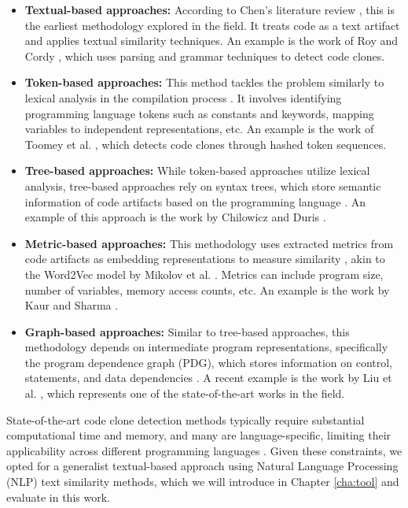 \begin{itemize}
    \item \textbf{Textual-based approaches:} According to Chen’s literature 
    review \citep{litreview}, this is the earliest methodology explored in 
    the field. It treats code as a text artifact and applies textual similarity
    techniques. An example is the work of Roy and Cordy \citep{textexample}, 
    which uses parsing and grammar techniques to detect code clones.

    \item \textbf{Token-based approaches:} This method tackles the problem 
    similarly to lexical analysis in the compilation process \citep{litreview}. 
    It involves identifying programming language tokens such as constants and 
    keywords, mapping variables to independent representations, etc. An example
    is the work of Toomey et al. \citep{tokenexample}, which detects code 
    clones through hashed token sequences.

    \item \textbf{Tree-based approaches:} While token-based approaches utilize
     lexical analysis, tree-based approaches rely on syntax trees, which store
     semantic information of code artifacts based on the programming language
     \citep{compiler}. An example of this approach is the work by Chilowicz 
     and Duris \citep{treeexample}.

    \item \textbf{Metric-based approaches:} This methodology uses extracted 
    metrics from code artifacts as embedding representations to measure 
    similarity \citep{litreview}, akin to the Word2Vec model by Mikolov et al. 
    \citep{wordtovec}. Metrics can include program size, number of variables, 
    memory access counts, etc. An example is the work by Kaur and Sharma \citep{metricexample}.

    \item \textbf{Graph-based approaches:} Similar to tree-based approaches, 
    this methodology depends on intermediate program representations, 
    specifically the program dependence graph (PDG), which stores information 
    on control, statements, and data dependencies \citep{prodg}. A recent 
    example is the work by Liu et al. \citep{tailor}, which represents one of 
    the state-of-the-art works in the field.
\end{itemize}

State-of-the-art code clone detection methods typically require substantial
computational time and memory, and many are language-specific, limiting their
applicability across different programming languages \citep{litreview}. Given
these constraints, we opted for a generalist textual-based approach using
Natural Language Processing (NLP) text similarity methods, which we will
introduce in Chapter \ref{cha:tool} and evaluate in this work.

